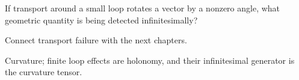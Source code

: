 \begin{exercise}\label{exr:vii24-ped-16}
If transport around a small loop rotates a vector by a nonzero angle, what geometric quantity is being detected infinitesimally?
\end{exercise}

\begin{hint}
Connect transport failure with the next chapters.
\end{hint}

\begin{solution}
Curvature; finite loop effects are holonomy, and their infinitesimal generator is the curvature tensor.
\end{solution}

